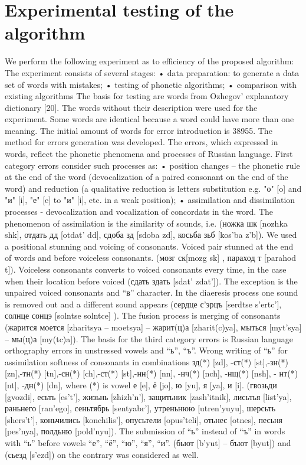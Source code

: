 \documentclass[conference,a4paper]{IEEEtran}
\begin{document}
\section{Experimental testing of the algorithm}
We perform the following experiment as to efficiency of the proposed algorithm:
The experiment consists of several stages:
•	data preparation: to generate a data set of words with mistakes;
•	testing of phonetic algorithms;
•	comparison with existing algorithms
The basis for testing are words from Ozhegov’ explanatory dictionary [20]. The words without their description were used for the experiment. Some words are identical because a word could have more than one meaning. The initial amount of words for error introduction is 38955.
The method for errors generation was developed. The errors, which expressed in words, reflect the phonetic phenomena and processes of Russian language. First category errors consider such processes as:
•	position changes – the phonetic rule at the end of the word (devocalization of a paired consonant on the end of the word) and reduction (a qualitative reduction is letters substitution e.g. "о" [o] and "и" [i], "е" [e] to "и" [i], etc. in a weak position);
•	assimilation and dissimilation processes - devocalization and vocalization of concordats in the word. The phenomenon of assimilation is the similarity of sounds, i.e. (ножка {шк} [nozhka {shk}], отдать {дд} [otdat’ {dd}], сдоба {зд} [sdoba {zd}], косьба {зьб} [kos’ba {z’b}]).
We used a positional stunning and voicing of consonants. Voiced pair stunned at the end of words and before voiceless consonants. (мозг {ск}[mozg {sk}] , параход {т} [parahod {t}]). Voiceless consonants converts to voiced consonants every time, in the case when their location before voiced (сдать {здать} [sdat’ {zdat’}]). The exception is the unpaired voiced consonants and “в” character. In the diaeresis process one sound is removed out and a different sound appears (сердце {с'эрцъ} [serdtse {s’ertc’}], солнце {сонцэ} [solntse {solntce}] ). The fusion process is merging of consonants (жарится моется [zharitsya – moetsya] – жарит(ц)а [zharit(c)ya], мыться [myt’sya] – мы(ц)а [my(tc)a]).
The basis for the third category errors is Russian language orthography errors in unstressed vowels and “ь”, “ъ”.
Wrong writing of “ь” for assimilation softness of consonants in combinations зд(*) [zd], -ст(*) [st],-зн(*) [zn],-тн(*) [tn],-сн(*) [ch],-ст(*) [st],-нн(*) [nn], -нч(*) [nch], -нщ(*) [nsh], - нт(*) [nt], -дн(*) [dn], where (*) is vowel е [e], ё [jo], ю [yu], я [ya], и [i]. (гвозьди [gvozdi], есьть [es’t’], жизьнь [zhizh’n’], защитьник [zash’itnik], лисьтья [list’ya], раньнего [ran’ego], сеньтябрь [sentyabr’], утреньнюю [utren’yuyu],  шерсьть [shers’t’], коньчились [konchilis’], опусьтели [opus’teli], отьнес [otnes], песьня [pes’nya], полдьню [pold’nyu]). The submission of “ь” instead of “ъ” in words with “ь” before vowels “е”, “ё”, “ю”, “я”, “и”. (бьют [b’yut] – бъют [byut]) and (сьезд [s’ezd]) on the contrary was considered as well.
\end{document}
